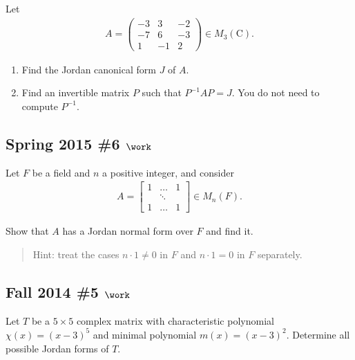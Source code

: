 Let
\begin{align*}
A=\left(\begin{array}{ccc}
-3 & 3 & -2 \\
-7 & 6 & -3 \\
1 & -1 & 2
\end{array}\right) \in M_{3}(\mathrm{C})
.\end{align*}

\begin{enumerate}
\def\labelenumi{\alph{enumi}.}
\item
  Find the Jordan canonical form \(J\) of \(A\).
\item
  Find an invertible matrix \(P\) such that \(P^{-1}A P = J\). You do
  not need to compute \(P^{-1}\).
\end{enumerate}

\hypertarget{spring-2015-6-work}{%
\subsection{\texorpdfstring{Spring 2015 \#6
\(\work\)}{Spring 2015 \#6 \textbackslash work}}\label{spring-2015-6-work}}

Let \(F\) be a field and \(n\) a positive integer, and consider
\begin{align*}
A=\left[\begin{array}{ccc}
1 & \dots & 1 \\
& \ddots & \\
1 & \dots & 1
\end{array}\right] \in M_{n}(F)
.\end{align*}

Show that \(A\) has a Jordan normal form over \(F\) and find it.

\begin{quote}
Hint: treat the cases \(n\cdot 1 \neq 0\) in \(F\) and \(n\cdot 1 = 0\)
in \(F\) separately.
\end{quote}

\hypertarget{fall-2014-5-work}{%
\subsection{\texorpdfstring{Fall 2014 \#5
\(\work\)}{Fall 2014 \#5 \textbackslash work}}\label{fall-2014-5-work}}

Let \(T\) be a \(5\times 5\) complex matrix with characteristic
polynomial \(\chi(x) = (x-3)^5\) and minimal polynomial
\(m(x) = (x-3)^2\). Determine all possible Jordan forms of \(T\).

